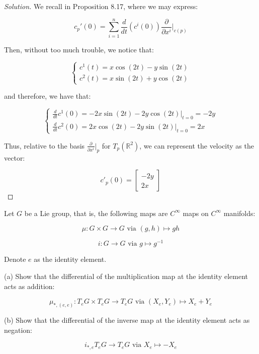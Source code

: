 \documentclass[10pt]{article}
\newenvironment{problem}[2][]{\begin{trivlist}
\item[\hskip \labelsep {\bfseries #1}\hskip \labelsep {\bfseries #2.}]}{\end{trivlist}}
\begin{document}
\begin{proof}[Solution]

We recall in Proposition 8.17, where we may express:

$$c_p'(0) = \sum_{i=1}^n \frac{d}{dt} (c^i(0)) \frac{\partial}{\partial x^i} \bigg|_{c(p)} $$

Then, without too much trouble, we notice that:

$$ \begin{cases} c^1(t) =  x\cos(2t)  -y\sin(2t)  \\   c^2(t) = x\sin(2t) +y \cos(2t) \end{cases} $$

and therefore, we have that:

$$ \begin{cases} \frac{d}{dt}  c^1(0) =  -2x\sin(2t)  -2y\cos(2t)\bigg|_{t=0} = -2y  \\  \frac{d}{dt}  c^2(0) = 2x\cos(2t) - 2y \sin(2t)\bigg|_{t=0} = 2x \end{cases} $$

Thus, relative to the basis $\frac{\partial}{\partial x^i}\bigg|_p$ for $T_p(\mathbb{R}^2)$, we can represent the velocity as the vector:

$$ c'_p(0) =  \begin{bmatrix} -2y \\ 2x \end{bmatrix} $$

\end{proof}

\begin{problem}{Question 5}

Let $G$ be a Lie group, that is, the following maps are $C^\infty$ maps on $C^\infty$ manifolds:

$$ \mu: G \times G \to G \text{ via } (g,h) \mapsto gh $$

$$ i: G \to G \text{ via } g \mapsto g^{-1} $$

Denote $e$ as the identity element.

(a) Show that the differential of the multiplication map at the identity element acts as addition:

$$ \mu_{*, (e,e)}: T_e G \times T_e G \to T_e G \text{ via } (X_e, Y_e) \mapsto X_e + Y_e $$

(b) Show that the differential of the inverse map at the identity element acts as negation:

$$ i_{*, e} T_e G \to T_e G \text{ via } X_e \mapsto -X_e $$

\end{problem}
\end{document}
